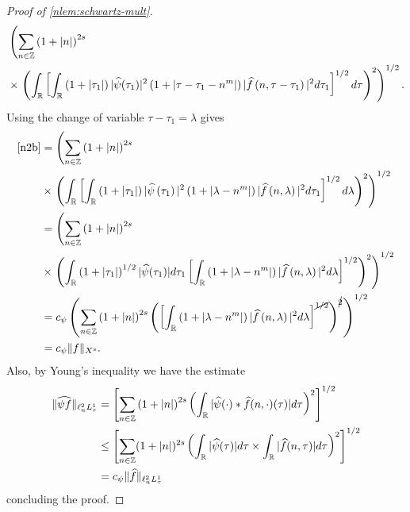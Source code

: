 \begin{proof}[Proof of \cref{nlem:schwartz-mult}]
\begin{equation}
\begin{split}
		& \left( \sum_{n \in \mathbb{Z}} \left (1 + |n| \right )^{2s}  \right.
		\\
		& \times \left. \left( \int_{\mathbb{R}} \left[ \int_{\mathbb{R}}
		\left( 1 + | \tau_{1} | \right) | \widehat{\psi}(\tau_1) |^2 \left( 1 + |
		\tau - \tau_1 - n^{m} |
		\right) | \widehat{f}\left( n, \tau - \tau_1 \right) |^2 d \tau_1 
		\right]^{1/2} d \tau \right)^2 \right)^{1/2}.
	\end{split}
\end{equation}
%
%
Using the change of variable $\tau - \tau_1 = \lambda$ gives
%
%
\begin{equation*}
	\begin{split}
		\eqref{n2b}
		& = \left( \sum_{n \in \mathbb{Z}} \left (1 + |n| \right )^{2s}\right.
		\\
		& \times \left.  \left( \int_{\mathbb{R}} \left[
		\int_{\mathbb{R}} \left( 1 + | \tau_1 | \right) | \widehat{\psi}\left( \tau_1
		\right) |^2 \left( 1 + | \lambda - n^{m} | \right) | \widehat{f} \left( n,
		\lambda
		\right)|^2 d \tau_1 \right]^{1/2} d \lambda \right)^2 \right)^{1/2}
		\\
		& =  \left( \sum_{n \in \mathbb{Z}} \left (1 + |n| \right )^{2s} \right.
		\\
		& \times \left. \left( \int_{\mathbb{R}} \left( 1 + |
		\tau_1 |
		\right)^{1/2} | \widehat{\psi}(\tau_1) | d \tau_1 \left[ \int_{\mathbb{R}} \left( 1 + |
		\lambda - n^{m} |
		\right) | \widehat{f}\left( n, \lambda \right) |^2 d \lambda \right]^{1/2}
		\right)^2 \right)^{1/2}
		\\
		& = c_{\psi} \left( \sum_{n \in \mathbb{Z}} \left (1 + |n| \right )^{2s} \left( \left[ \int_{\mathbb{R}}
		\left( 1 + | \lambda - n^{m} | \right) | \widehat{f}\left( n, \lambda
		\right) |^2 d \lambda
		\right]^{\cancel{1/2}} \right)^{\cancel{2}} \right)^{1/2}
		\\
		& = c_{\psi} \|f\|_{X^s}.
	\end{split}
\end{equation*}
%
Also, by Young's inequality we have the estimate 
%
%
\begin{equation*}
\begin{split}
  \|\widehat{\psi f}\|_{\ell^{2}_{n} L^{1}_{\tau}} 
  & = \left[ \sum_{n \in \mathbb{Z}} \left (1 + |n| \right )^{2s} \left (
  \int_{\mathbb{R}} | \widehat{\psi}(\cdot) * \widehat{f}(n, \cdot)(\tau) | d \tau  \right ) ^2 \right]^{1/2}
  \\
  & \le  \left[ \sum_{n \in \mathbb{Z}} (1 + | n |)^{2s} \left( \int_{\mathbb{R}} |
    \widehat{\psi}(\tau) | d \tau  \times \int_{\mathbb{R}} | \widehat{f}(n, \tau) | d \tau
    \right)^{2}\right]^{1/2}
  \\
  & = c_{\psi} \| \widehat{f} \|_{\ell^{2}_{n} L^{1}_{\tau}}
\end{split}
\end{equation*}
%
%
%
concluding the proof. 
\end{proof}
